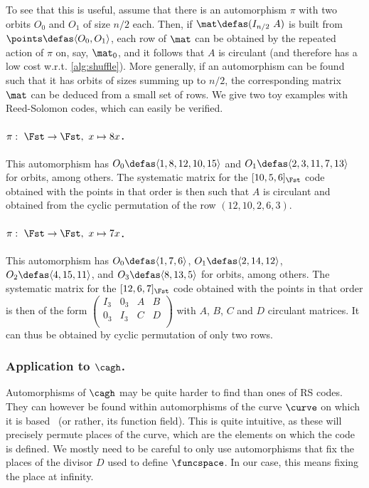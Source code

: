 To see that this is useful, assume that there is an automorphism $\pi$ with two orbits $O_0$ and $O_1$ of size $n/2$ each. Then, if $\mat \defas (I_{n/2}~A)$ is
built from $\points \defas \langle O_0, O_1\rangle$, each row of $\mat$ can be obtained by the repeated action of $\pi$ on, say, $\mat_0$, and it follows
that $A$ is circulant (and therefore has a low cost w.r.t. \autoref{alg:shuffle}). More generally, if an automorphism can be found such that it has orbits of sizes summing up to
$n/2$, the corresponding matrix $\mat$ can be deduced from a small set of rows. We give two toy examples with Reed-Solomon codes, which can easily be verified.

\paragraph{$\pi:~\Fst \rightarrow \Fst,~x \mapsto 8 x$.} This automorphism has $O_0\defas \langle 1, 8, 12, 10, 15\rangle$
and $O_1 \defas \langle 2, 3, 11, 7, 13\rangle$ for orbits, among others. The systematic matrix for the $[10, 5, 6]_{\Fst}$ code obtained with the points in that
order is then such that $A$ is circulant and obtained from the cyclic permutation of the row $(12, 10, 2, 6, 3)$.

\paragraph{$\pi:~\Fst \rightarrow \Fst,~x \mapsto 7 x$.} This automorphism has $O_0 \defas \langle 1, 7, 6\rangle$,
$O_1 \defas \langle 2, 14, 12\rangle$, $O_2 \defas \langle 4, 15, 11\rangle$, and $O_3 \defas \langle 8, 13, 5\rangle$ for orbits, among others.
The systematic matrix for the $[12, 6, 7]_{\Fst}$ code obtained with the points in that
order is then of the form
$\begin{pmatrix}
	I_3 & 0_3 & A & B \\
	0_3 & I_3 & C & D\\
\end{pmatrix}$ with $A$, $B$, $C$ and $D$ circulant matrices. It can thus be obtained by cyclic permutation of only two rows.

\medskip

\subsubsection{Application to $\cagh$.}
Automorphisms of $\cagh$ may be quite harder to find than ones of RS codes. They can however
be found within automorphisms of the curve $\curve$ on which it is based~\cite{stichtenoth} (or rather, its function field). This is quite intuitive, as these will precisely permute
places of the curve, which are the elements on which the code is defined. We mostly need to be careful to only use automorphisms that fix the places of the divisor
$D$ used to define $\funcspace$. In our case, this means fixing the place at infinity.

